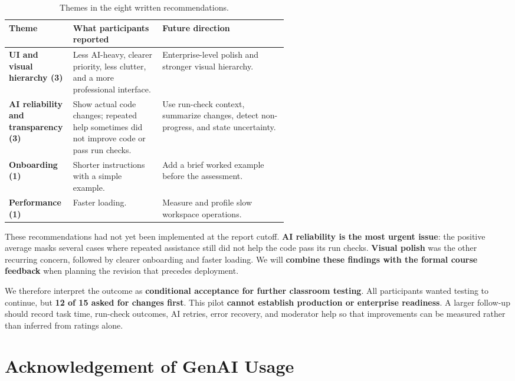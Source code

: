 \documentclass[11pt,a4paper]{article}
\begin{document}
\begin{table}[H]
\centering
\footnotesize
\begin{tabularx}{\linewidth}{>{\raggedright\arraybackslash}p{0.23\linewidth}>{\raggedright\arraybackslash}p{0.32\linewidth}>{\raggedright\arraybackslash}X}
\toprule
Theme & What participants reported & Future direction \\
\midrule
\textbf{UI and visual hierarchy (3)} & Less AI-heavy, clearer priority, less clutter, and a more professional interface. & Enterprise-level polish and stronger visual hierarchy. \\
\textbf{AI reliability and transparency (3)} & Show actual code changes; repeated help sometimes did not improve code or pass run checks. & Use run-check context, summarize changes, detect non-progress, and state uncertainty. \\
\textbf{Onboarding (1)} & Shorter instructions with a simple example. & Add a brief worked example before the assessment. \\
\textbf{Performance (1)} & Faster loading. & Measure and profile slow workspace operations. \\
\bottomrule
\end{tabularx}
\caption{Themes in the eight written recommendations.}
\label{tab:uat-feedback}
\end{table}

These recommendations had not yet been implemented at the report cutoff. \textbf{AI reliability is the most urgent issue}: the positive average masks several cases where repeated assistance still did not help the code pass its run checks. \textbf{Visual polish} was the other recurring concern, followed by clearer onboarding and faster loading. We will \textbf{combine these findings with the formal course feedback} when planning the revision that precedes deployment.

We therefore interpret the outcome as \textbf{conditional acceptance for further classroom testing}. All participants wanted testing to continue, but \textbf{12 of 15 asked for changes first}. This pilot \textbf{cannot establish production or enterprise readiness}. A larger follow-up should record task time, run-check outcomes, AI retries, error recovery, and moderator help so that improvements can be measured rather than inferred from ratings alone.

\section{Acknowledgement of GenAI Usage}
\end{document}
